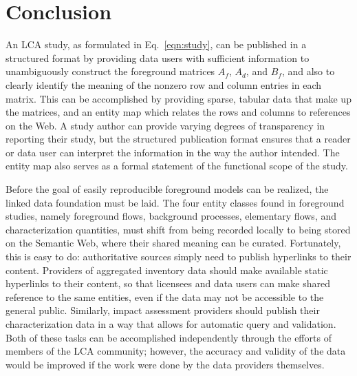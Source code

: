 \section{Conclusion}

An LCA study, as formulated in Eq.~\ref{eqn:study}, can be published in a structured format by providing data users with sufficient information to unambiguously construct the foreground matrices $A_f$, $A_d$, and $B_f$, and also to clearly identify the meaning of the nonzero row and column entries in each matrix.  This can be accomplished by providing sparse, tabular data that make up the matrices, and an entity map which relates the rows and columns to references on the Web.  A study author can provide varying degrees of transparency in reporting their study, but the structured publication format ensures that a reader or data user can interpret the information in the way the author intended.  The entity map also serves as a formal statement of the functional scope of the study.

Before the goal of easily reproducible foreground models can be realized, the linked data foundation must be laid.   The four entity classes found in foreground studies, namely foreground flows, background processes, elementary flows, and characterization quantities, must shift from being recorded locally to being stored on the Semantic Web, where their shared meaning can be curated.  Fortunately, this is easy to do: authoritative sources simply need to publish hyperlinks to their content. Providers of aggregated inventory data should make available static hyperlinks to their content, so that licensees and data users can make shared reference to the same entities, even if the data may not be accessible to the general public. %
Similarly, impact assessment providers should publish their characterization data in a way that allows for automatic query and validation.  Both of these tasks can be accomplished independently through the efforts of members of the LCA community; however, the accuracy and validity of the data would be improved if the work were done by the data providers themselves.

